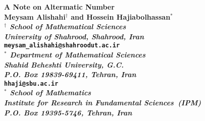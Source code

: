 \documentclass[11pt]{article}
\begin{document}
{}
\begin{center}
{\Large \bf  A Note on Altermatic Number}\\
\vspace{0.3 cm}
{\bf Meysam Alishahi$^\dag$ and Hossein Hajiabolhassan$^\ast$\\
{\it $^\dag$ School of Mathematical Sciences}\\
{\it University of Shahrood, Shahrood, Iran}\\
{\tt meysam\_alishahi@shahroodut.ac.ir}\\
{\it $^\ast$ Department of Mathematical Sciences}\\
{\it Shahid Beheshti University, G.C.}\\
{\it P.O. Box {\rm 19839-69411}, Tehran, Iran}\\
{\tt hhaji@sbu.ac.ir}\\
{\it $^\ast$ School of Mathematics}\\
{\it Institute for Research in Fundamental Sciences~(IPM)}\\
{\it P.O. Box {\rm 19395-5746}, Tehran, Iran}\\
}
\end{center}
\begin{abstract}
\noindent
In view of Tucker's lemma (an equivalent combinatorial version of the Borsuk-Ulam theorem), the present authors (2013) introduced
the $k^{th}$ altermatic number of a graph $G$ as a tight lower bound for the chromatic number of $G$.
In this note, we present a purely combinatorial proof for this result.\\

\ {General Kneser Graph, Chromatic Number,  Altermatic Number.}\\
{\bf Subject classification: 05C15}
\end{abstract}
\end{document}
